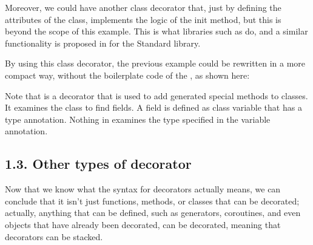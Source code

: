 \documentclass[a4paper,10pt,english]{sphinxmanual}
\begin{document}
Moreover, we could have another class decorator that, just by defining the attributes of the
class, implements the logic of the init method, but this is beyond the scope of this
example. This is what libraries such as  do, and a similar functionality is
proposed in for the Standard library.

By using this class decorator, the previous example could be
rewritten in a more compact way, without the boilerplate code of the , as shown here:

\begin{sphinxVerbatim}[commandchars=\\\{\}]
   
   

 
     
     
     
     
\end{sphinxVerbatim}

Note that  is a decorator that is used to add generated special methods to classes.
It examines the class to find fields. A field is defined as class variable that has a type annotation.
Nothing in  examines the type specified in the variable annotation.


\subsection{1.3. Other types of decorator}
\label{\detokenize{chapters/5_decorators/index:other-types-of-decorator}}
Now that we know what the  syntax for decorators actually means, we can conclude that
it isn’t just functions, methods, or classes that can be decorated; actually, anything that can
be defined, such as generators, coroutines, and even objects that have already been
decorated, can be decorated, meaning that decorators can be stacked.
\end{document}
